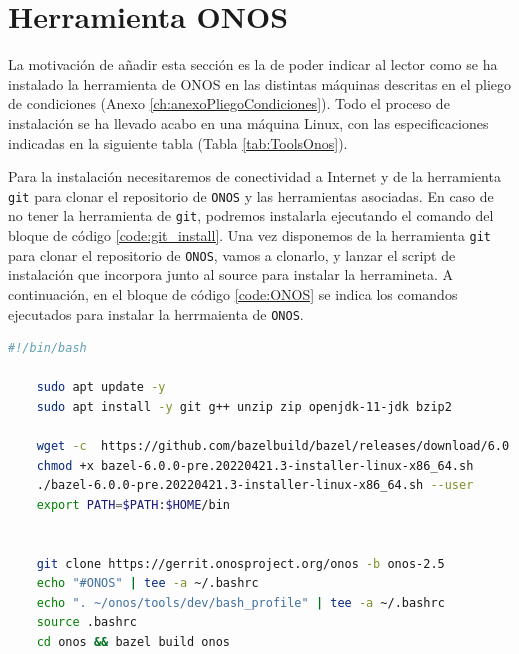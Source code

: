 \newpage
\section{Herramienta ONOS}
\label{sec:ToolsOnos}
La motivación de añadir esta sección es la de poder indicar al lector como se ha instalado la herramienta de ONOS en las distintas máquinas descritas en el pliego de condiciones (Anexo \ref{ch:anexoPliegoCondiciones}). Todo el proceso de instalación se ha llevado acabo en una máquina Linux, con las especificaciones indicadas en la siguiente tabla (Tabla \ref{tab:ToolsOnos}).

\begin{table}[ht!]
    \centering
    \caption{Especificaciones máquina de instalación de ONOS}
    \label{tab:ToolsOnos}
\end{table}

Para la instalación necesitaremos de conectividad a Internet y de la herramienta \texttt{git} para clonar el repositorio de \texttt{ONOS} y las herramientas asociadas. En caso de no tener la herramienta de \texttt{git}, podremos instalarla ejecutando el comando del bloque de código \ref{code:git_install}. Una vez disponemos de la herramienta \texttt{git} para clonar el repositorio de \texttt{ONOS}, vamos a clonarlo, y lanzar el script de instalación que incorpora junto al source para instalar la herramineta. A continuación, en el bloque de código \ref{code:ONOS} se indica los comandos ejecutados para instalar la herrmaienta de \texttt{ONOS}.


\begin{lstlisting}[language= bash, style=Consola2, caption={Instalación de la herramienta ONOS},label=code:ONOS]
    #!/bin/bash

    sudo apt update -y
    sudo apt install -y git g++ unzip zip openjdk-11-jdk bzip2
    
    wget -c  https://github.com/bazelbuild/bazel/releases/download/6.0.0-pre.20220421.3/bazel-6.0.0-pre.20220421.3-installer-linux-x86_64.sh
    chmod +x bazel-6.0.0-pre.20220421.3-installer-linux-x86_64.sh
    ./bazel-6.0.0-pre.20220421.3-installer-linux-x86_64.sh --user 
    export PATH=$PATH:$HOME/bin
    
    
    git clone https://gerrit.onosproject.org/onos -b onos-2.5
    echo "#ONOS" | tee -a ~/.bashrc
    echo ". ~/onos/tools/dev/bash_profile" | tee -a ~/.bashrc
    source .bashrc
    cd onos && bazel build onos 
\end{lstlisting}
\vspace{1cm}

